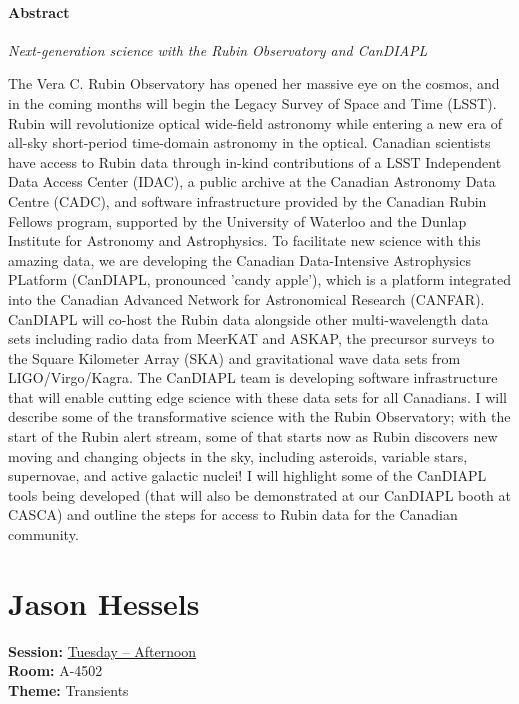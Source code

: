 \paragraph{Abstract}
{\itshape
Next-generation science with the Rubin Observatory and CanDIAPL

The Vera C. Rubin Observatory has opened her massive eye on the cosmos, and in the coming months will begin the Legacy Survey of Space and Time (LSST). Rubin will revolutionize optical wide-field astronomy while entering a new era of all-sky short-period time-domain astronomy in the optical. Canadian scientists have access to Rubin data through in-kind contributions of a LSST Independent Data Access Center (IDAC), a public archive at the Canadian Astronomy Data Centre (CADC), and software infrastructure provided by the Canadian Rubin Fellows program, supported by the University of Waterloo and the Dunlap Institute for Astronomy and Astrophysics. To facilitate new science with this amazing data, we are developing the Canadian Data-Intensive Astrophysics PLatform (CanDIAPL, pronounced 'candy apple'), which is a platform integrated into the Canadian Advanced Network for Astronomical Research (CANFAR). CanDIAPL will co-host the Rubin data alongside other multi-wavelength data sets including radio data from MeerKAT and ASKAP, the precursor surveys to the Square Kilometer Array (SKA) and gravitational wave data sets from LIGO/Virgo/Kagra. The CanDIAPL team is developing software infrastructure that will enable cutting edge science with these data sets for all Canadians. I will describe some of the transformative science with the Rubin Observatory; with the start of the Rubin alert stream, some of that starts now as Rubin discovers new moving and changing objects in the sky, including asteroids, variable stars, supernovae, and active galactic nuclei! I will highlight some of the CanDIAPL tools being developed (that will also be demonstrated at our CanDIAPL booth at CASCA) and outline the steps for access to Rubin data for the Canadian community.
}

\hypertarget{invited-jason-hessels}{}
\label{invited-page-jason-hessels}
\section{Jason Hessels}
\textbf{Session:} \hyperlink{schedule-tuesday-afternoon-a-4502}{Tuesday -- Afternoon}\\
\textbf{Room:} A-4502\\
\textbf{Theme:} Transients\\

